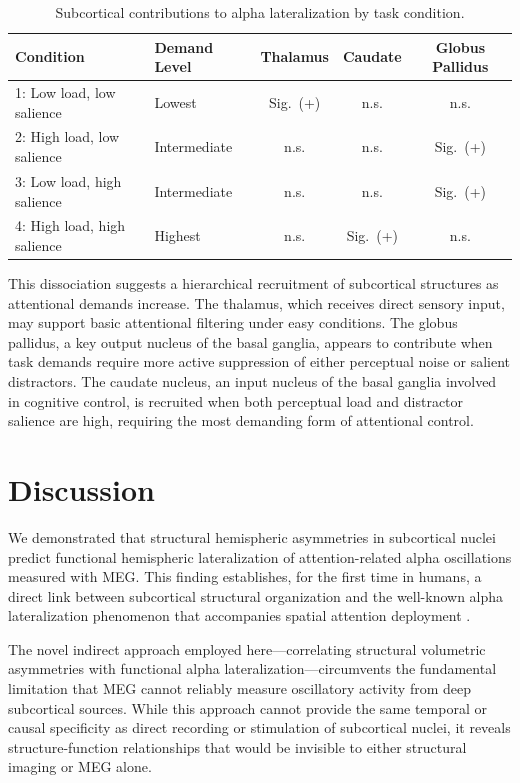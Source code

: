 \documentclass[12pt]{article}
\begin{document}
\begin{table}[ht]
\centering
\caption{Subcortical contributions to alpha lateralization by task condition.}
\label{tab:conditions_results}
\begin{tabular}{llccc}
\toprule
Condition & Demand Level & Thalamus & Caudate & Globus Pallidus \\
\midrule
1: Low load, low salience & Lowest & Sig.\ (+) & n.s. & n.s. \\
2: High load, low salience & Intermediate & n.s. & n.s. & Sig.\ (+) \\
3: Low load, high salience & Intermediate & n.s. & n.s. & Sig.\ (+) \\
4: High load, high salience & Highest & n.s. & Sig.\ (+) & n.s. \\
\bottomrule
\end{tabular}
\end{table}

This dissociation suggests a hierarchical recruitment of subcortical structures as attentional demands increase. The thalamus, which receives direct sensory input, may support basic attentional filtering under easy conditions. The globus pallidus, a key output nucleus of the basal ganglia, appears to contribute when task demands require more active suppression of either perceptual noise or salient distractors. The caudate nucleus, an input nucleus of the basal ganglia involved in cognitive control, is recruited when both perceptual load and distractor salience are high, requiring the most demanding form of attentional control.

\section{Discussion}

We demonstrated that structural hemispheric asymmetries in subcortical nuclei predict functional hemispheric lateralization of attention-related alpha oscillations measured with MEG. This finding establishes, for the first time in humans, a direct link between subcortical structural organization and the well-known alpha lateralization phenomenon that accompanies spatial attention deployment \citep{worden2000anticipatory, thut2006alpha}.

The novel indirect approach employed here---correlating structural volumetric asymmetries with functional alpha lateralization---circumvents the fundamental limitation that MEG cannot reliably measure oscillatory activity from deep subcortical sources. While this approach cannot provide the same temporal or causal specificity as direct recording or stimulation of subcortical nuclei, it reveals structure-function relationships that would be invisible to either structural imaging or MEG alone.
\end{document}
